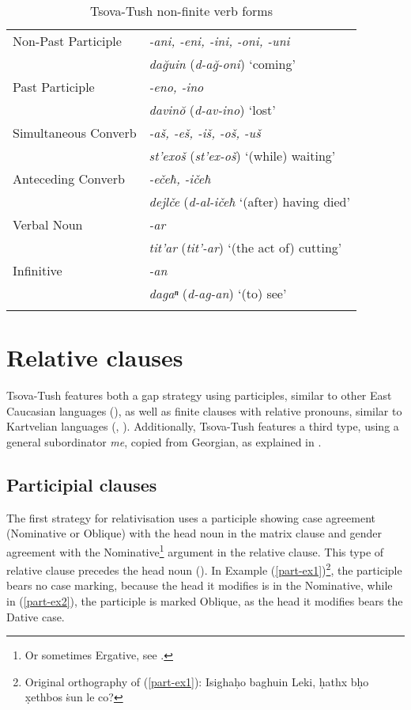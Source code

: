 \begin{table}
	\begin{tabular}{ll}
		\lsptoprule
		Non-Past Participle & \textit{-ani, -eni, -ini, -oni, -uni} \\
							& \textit{da\u{g}uin} (\textit{d-a\u{g}-oni}) `coming' \\
		Past Participle & \textit{-eno, -ino} \\
						& \textit{davin\u{o}} (\textit{d-av-ino}) `lost' \\
		Simultaneous Converb & \textit{-aš, -eš, -iš, -oš, -uš} \\
							 & \textit{st'exoš} (\textit{st'ex-oš}) `(while) waiting' \\
		Anteceding Converb & \textit{-ečeħ, -ičeħ} \\
						   & \textit{dejlče} (\textit{d-al-ičeħ} `(after) having died'  \\
		Verbal Noun & \textit{-ar} \\
				    & \textit{tit'ar} (\textit{tit'-ar}) `(the act of) cutting' \\
		Infinitive & \textit{-an} \\
		           & \textit{dagaⁿ} (\textit{d-ag-an}) `(to) see' \\
       \lspbottomrule
	\end{tabular}
	\caption{Tsova-Tush non-finite verb forms}
	\label{table-subord1}
\end{table}




\section{Relative clauses} \label{relative}

Tsova-Tush features both a gap strategy using participles, similar to other East Caucasian languages (\cite{nichols17rel,comrieforker17rel}), as well as finite  clauses with relative pronouns, similar to Kartvelian languages (\cite[190]{nichols17rel}, \cite[284--287]{aronson91}). Additionally, Tsova-Tush features a third type, using a general subordinator \textit{me}, copied from Georgian, as explained in .


\subsection{Participial clauses} \label{participial}

The first strategy for relativisation uses a participle showing case agreement (Nominative or Oblique) with the head noun in the matrix clause and gender agreement with the Nominative\footnote{Or sometimes Ergative, see .} argument in the relative clause. This type of relative clause precedes the head noun (\cites[205]{holiskygagua}[39--40]{haukharris}). In Example (\ref{part-ex1})\footnote{Original orthography of (\ref{part-ex1}): Isighaḥo baghuin Leki, ḥathx bḥo x̣ethbos \.{s}un le co?}, the participle bears no case marking, because the head it modifies is in the Nominative, while in (\ref{part-ex2}), the participle is marked Oblique, as the head it modifies bears the Dative case.


